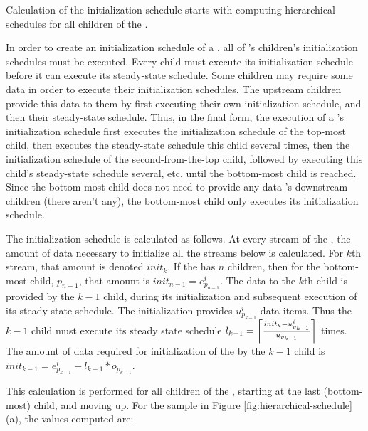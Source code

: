 
Calculation of the initialization schedule starts with computing
hierarchical schedules for all children of the {\pipeline}.

In order to create an initialization schedule of a {\pipeline}, all
of {\pipeline}'s children's initialization schedules must be
executed. Every child must execute its initialization schedule
before it can execute its steady-state schedule.  Some children
may require some data in order to execute their initialization
schedules. The upstream children provide this data to them by
first executing their own initialization schedule, and then their
steady-state schedule. Thus, in the final form, the execution of a
{\pipeline}'s initialization schedule first executes the
initialization schedule of the top-most child, then executes the
steady-state schedule this child several times, then the
initialization schedule of the second-from-the-top child, followed
by executing this child's steady-state schedule several, etc,
until the bottom-most child is reached.  Since the bottom-most
child does not need to provide any data {\pipeline}'s downstream
children (there aren't any), the bottom-most child only executes
its initialization schedule.

The initialization schedule is calculated as follows. At every
stream of the {\pipeline}, the amount of data necessary to
initialize all the streams below is calculated. For $k$th stream,
that amount is denoted $init_k$. If the {\pipeline} has $n$
children, then for the bottom-most child, $p_{n-1}$, that amount
is $init_{n-1} = e^i_{p_{n-1}}$. The data to the $k$th child is
provided by the $k-1$ child, during its initialization and
subsequent execution of its steady state schedule.  The
initialization provides $u^i_{p_{k-1}}$ data items. Thus the $k-1$
child must execute its steady state schedule $l_{k-1} =
\left\lceil init_k - u^i_{p_{k-1}} \over u_{p_{k-1}} \right\rceil$
times.  The amount of data required for initialization of the
{\pipeline} by the $k-1$ child is $init_{k-1} = e^i_{p_{k-1}} +
l_{k-1} * o_{p_{k-1}}$.

This calculation is performed for all children of the {\pipeline},
starting at the last (bottom-most) child, and moving up.  For the
sample {\pipeline} in Figure \ref{fig:hierarchical-schedule}(a), the
values computed are:

